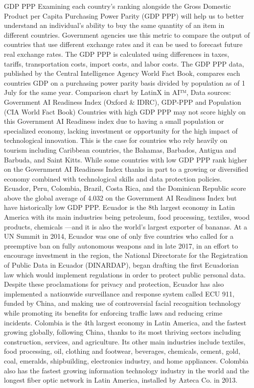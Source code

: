 \documentclass[conference]{IEEEtran}
\begin{document}
GDP PPP
Examining each country's ranking alongside the Gross Domestic Product per Capita Purchasing Power Parity (GDP PPP) will help us to better understand an individual's ability to buy the same quantity of an item in different countries. Government agencies use this metric to compare the output of countries that use different exchange rates and it can be used to forecast future real exchange rates. The GDP PPP is calculated using differences in taxes, tariffs, transportation costs, import costs, and labor costs.
The GDP PPP data, published by the Central Intelligence Agency World Fact Book, compares each countries GDP on a purchasing power parity basis divided by population as of 1 July for the same year.
Comparison chart by LatinX in AI™, Data sources: Government AI Readiness Index (Oxford \& IDRC), GDP-PPP and Population (CIA World Fact Book)
Countries with high GDP PPP may not score highly on this Government AI Readiness index due to having a small population or specialized economy, lacking investment or opportunity for the high impact of technological innovation. This is the case for countries who rely heavily on tourism including Caribbean countries, the Bahamas, Barbados, Antigua and Barbuda, and Saint Kitts.
While some countries with low GDP PPP rank higher on the Government AI Readiness Index thanks in part to a growing or diversified economy combined with technological skills and data protection policies. Ecuador, Peru, Colombia, Brazil, Costa Rica, and the Dominican Republic score above the global average of 4.032 on the Government AI Readiness Index but have historically low GDP PPP.
Ecuador is the 8th largest economy in Latin America with its main industries being petroleum, food processing, textiles, wood products, chemicals —and it is also the world's largest exporter of bananas. At a UN Summit in 2014, Ecuador was one of only five countries who called for a preemptive ban on fully autonomous weapons and in late 2017, in an effort to encourage investment in the region, the National Directorate for the Registration of Public Data in Ecuador (DINARDAP), began drafting the first Ecuadorian law which would implement regulations in order to protect public personal data. Despite these proclamations for privacy and protection, Ecuador has also implemented a nationwide surveillance and response system called ECU 911, funded by China, and making use of controversial facial recognition technology while promoting its benefits for enforcing traffic laws and reducing crime incidents.
Colombia is the 4th largest economy in Latin America, and the fastest growing globally, following China, thanks to its most thriving sectors including construction, services, and agriculture. Its other main industries include textiles, food processing, oil, clothing and footwear, beverages, chemicals, cement, gold, coal, emeralds, shipbuilding, electronics industry, and home appliances. Colombia also has the fastest growing information technology industry in the world and the longest fiber optic network in Latin America, installed by Azteca Co. in 2013.
\end{document}
